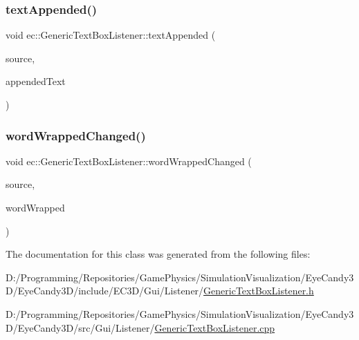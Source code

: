 \subsubsection{\texorpdfstring{text\+Appended()}{textAppended()}}
{\footnotesize\ttfamily void ec\+::\+Generic\+Text\+Box\+Listener\+::text\+Appended (\begin{DoxyParamCaption}\item[{agui\+::\+Text\+Box $\ast$}]{source,  }\item[{const std\+::string \&}]{appended\+Text }\end{DoxyParamCaption})\hspace{0.3cm}{\ttfamily [override]}}

\mbox{\label{classec_1_1_generic_text_box_listener_a96cdc8f0e3932f1cfbe2fd6888818452}} 
\subsubsection{\texorpdfstring{word\+Wrapped\+Changed()}{wordWrappedChanged()}}
{\footnotesize\ttfamily void ec\+::\+Generic\+Text\+Box\+Listener\+::word\+Wrapped\+Changed (\begin{DoxyParamCaption}\item[{agui\+::\+Text\+Box $\ast$}]{source,  }\item[{bool}]{word\+Wrapped }\end{DoxyParamCaption})\hspace{0.3cm}{\ttfamily [override]}}



The documentation for this class was generated from the following files\+:\begin{DoxyCompactItemize}
\item 
D\+:/\+Programming/\+Repositories/\+Game\+Physics/\+Simulation\+Visualization/\+Eye\+Candy3\+D/\+Eye\+Candy3\+D/include/\+E\+C3\+D/\+Gui/\+Listener/\mbox{\hyperlink{_generic_text_box_listener_8h}{Generic\+Text\+Box\+Listener.\+h}}\item 
D\+:/\+Programming/\+Repositories/\+Game\+Physics/\+Simulation\+Visualization/\+Eye\+Candy3\+D/\+Eye\+Candy3\+D/src/\+Gui/\+Listener/\mbox{\hyperlink{_generic_text_box_listener_8cpp}{Generic\+Text\+Box\+Listener.\+cpp}}\end{DoxyCompactItemize}
